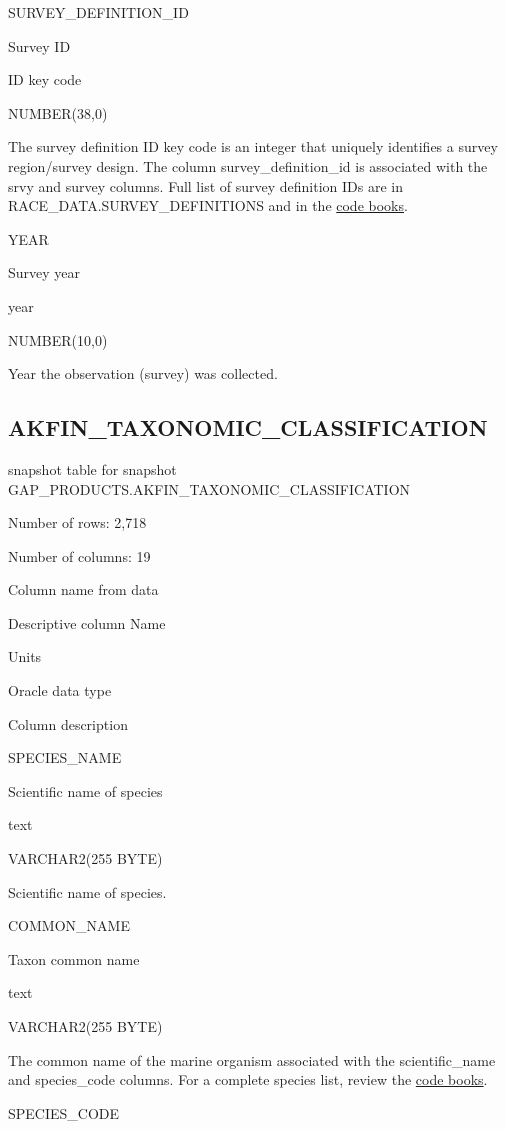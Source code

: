 \documentclass[
  letterpaper,
  oneside,
  open=any]{scrbook}
\begin{document}
SURVEY\_DEFINITION\_ID

Survey ID

ID key code

NUMBER(38,0)

The survey definition ID key code is an integer that uniquely identifies
a survey region/survey design. The column survey\_definition\_id is
associated with the srvy and survey columns. Full list of survey
definition IDs are in RACE\_DATA.SURVEY\_DEFINITIONS and in the
\href{https://www.fisheries.noaa.gov/resource/document/groundfish-survey-species-code-manual-and-data-codes-manual}{code
books}.

YEAR

Survey year

year

NUMBER(10,0)

Year the observation (survey) was collected.

\subsection{AKFIN\_TAXONOMIC\_CLASSIFICATION}\label{akfin_taxonomic_classification}

snapshot table for snapshot
GAP\_PRODUCTS.AKFIN\_TAXONOMIC\_CLASSIFICATION

Number of rows: 2,718

Number of columns: 19

Column name from data

Descriptive column Name

Units

Oracle data type

Column description

SPECIES\_NAME

Scientific name of species

text

VARCHAR2(255 BYTE)

Scientific name of species.

COMMON\_NAME

Taxon common name

text

VARCHAR2(255 BYTE)

The common name of the marine organism associated with the
scientific\_name and species\_code columns. For a complete species list,
review the
\href{https://www.fisheries.noaa.gov/resource/document/groundfish-survey-species-code-manual-and-data-codes-manual}{code
books}.

SPECIES\_CODE
\end{document}
